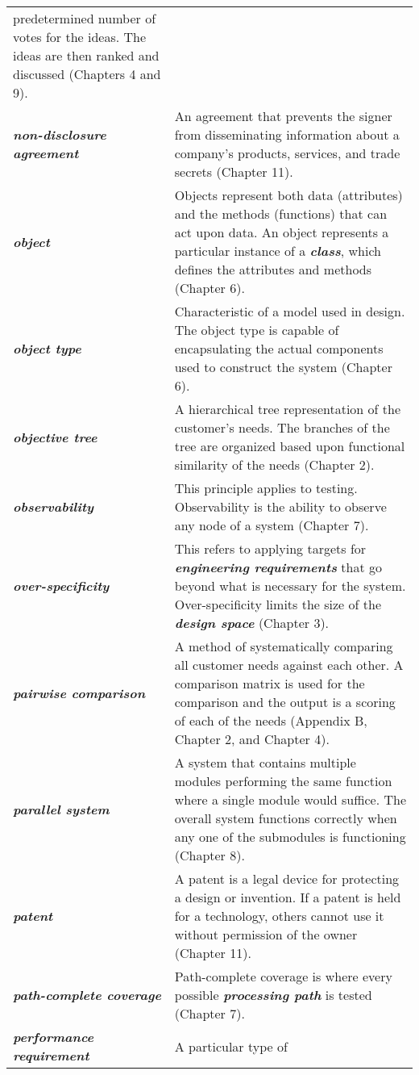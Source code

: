 \begin{longtable}[]{@{}
  >{\raggedright\arraybackslash}p{}
  >{\raggedright\arraybackslash}p{}@{}}
predetermined number of votes for the ideas. The ideas are then ranked
and discussed (Chapters 4 and 9). \\
\emph{\textbf{non-disclosure agreement}} & An agreement that prevents
the signer from disseminating information about a company's products,
services, and trade secrets (Chapter 11). \\
\emph{\textbf{object}} & Objects represent both data (attributes) and
the methods (functions) that can act upon data. An object represents a
particular instance of a \emph{\textbf{class}}, which defines the
attributes and methods (Chapter 6). \\
\emph{\textbf{object type}} & Characteristic of a model used in design.
The object type is capable of encapsulating the actual components used
to construct the system (Chapter 6). \\
\emph{\textbf{objective tree}} & A hierarchical tree representation of
the customer's needs. The branches of the tree are organized based upon
functional similarity of the needs (Chapter 2). \\
\emph{\textbf{observability}} & This principle applies to testing.
Observability is the ability to observe any node of a system (Chapter
7). \\
\emph{\textbf{over-specificity}} & This refers to applying targets for
\emph{\textbf{engineering requirements}} that go beyond what is
necessary for the system. Over-specificity limits the size of the
\emph{\textbf{design space}} (Chapter 3). \\
\emph{\textbf{pairwise comparison}} & A method of systematically
comparing all customer needs against each other. A comparison matrix is
used for the comparison and the output is a scoring of each of the needs
(Appendix B, Chapter 2, and Chapter 4). \\
\emph{\textbf{parallel system}} & A system that contains multiple
modules performing the same function where a single module would
suffice. The overall system functions correctly when any one of the
submodules is functioning (Chapter 8). \\
\emph{\textbf{patent}} & A patent is a legal device for protecting a
design or invention. If a patent is held for a technology, others cannot
use it without permission of the owner (Chapter 11). \\
\emph{\textbf{path-complete coverage}} & Path-complete coverage is where
every possible \emph{\textbf{processing path}} is tested (Chapter 7). \\
\emph{\textbf{performance requirement}} & A particular type of

\end{longtable}

